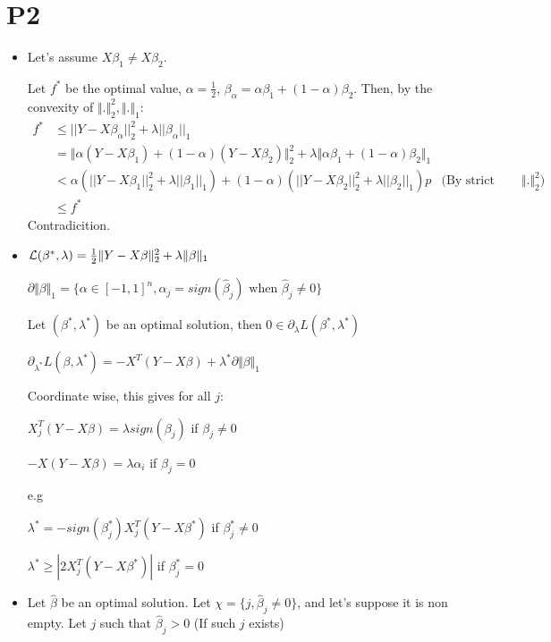 \documentclass[12pt]{article}
\newcommand{\norm}[1]{\Vert #1 \Vert}
\begin{document}
\section{P2}
\begin{itemize}
\item
  Let's assume  $X\beta_1 \ne X\beta_2$.
  
  Let $f^*$ be the optimal value, $\alpha = \frac12$, $\beta_{\alpha} = \alpha \beta_1 + (1-\alpha) \beta_2$.
  Then, by the convexity of $\norm{.}_2^2, \norm{.}_1$:
  \begin{align*}
    f^* &\le ||Y - X \beta_{\alpha}||_2^2 + \lambda ||\beta_{\alpha}||_1
    \\&= \norm{ \alpha (Y - X \beta_1) + (1-\alpha)(Y - X\beta_2)}_2^2
        + \lambda \norm{\alpha \beta_1 + (1-\alpha)\beta_2}_1
    \\&<
        \alpha \left(||Y - X \beta_1||_2^2 + \lambda ||\beta_1||_1\right)
        + (1-\alpha)\left(||Y - X \beta_2||_2^2 + \lambda ||\beta_2||_1\right)p
        &\text{(By strict convexity of $\norm{.}_2^2$)}
    \\&\le f^*
  \end{align*}
  Contradicition.
  
\item
  ${\cal L}(\beta^*, \lambda) = \frac12 \norm{Y-X\beta}_2^2 + \lambda \norm{\beta}_1$

  $\partial \norm{\beta}_1 = \{ \alpha \in [-1, 1]^n, \alpha_j = sign(\hat \beta_j) \text{ when } \hat \beta_j \ne 0\}$
  
  Let $(\beta^*, \lambda^*)$ be an optimal solution, then $0 \in \partial_{\lambda} L (\beta^*, \lambda^*)$

  $\partial_{\lambda^*} L (\beta, \lambda^*) =  -X^T(Y-X\beta) +  \lambda^* \partial \norm{\beta}_1$

  Coordinate wise, this gives for all $j$:
  
  $ X_j^T (Y - X\beta) = \lambda sign(\beta_j)$ if $\beta_j \ne 0$
  
  $ - X (Y - X\beta) = \lambda \alpha_i$ if $\beta_j = 0$
  
  e.g
  
  $ \lambda^* = -sign(\beta_j^*) X_j^T(Y - X\beta^*)$ if $\beta_j^* \ne 0$
  
  $ \lambda^* \ge |2  X_j^T(Y - X\beta^*)|$ if $\beta_j^* = 0$
  

  
\item
  Let $\hat \beta$ be an optimal solution. Let $\chi = \{ j, \hat \beta_j \ne 0 \}$, and let's suppose it is non empty.
  Let $j$ such that $\hat \beta_j > 0$ (If such $j$ exists)
  

\end{itemize}
\end{document}
